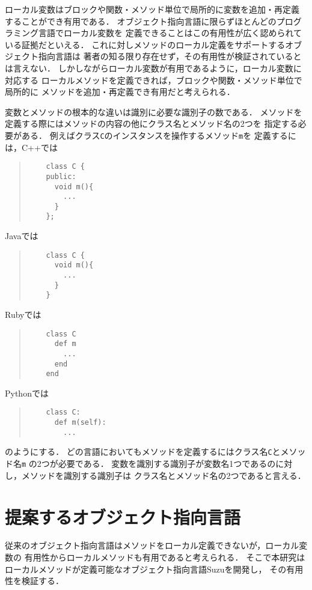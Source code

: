 \documentclass[a4paper,11pt,dvipdfmx]{jreport}
\begin{document}
ローカル変数はブロックや関数・メソッド単位で局所的に変数を追加・再定義
することができ有用である．
オブジェクト指向言語に限らずほとんどのプログラミング言語でローカル変数を
定義できることはこの有用性が広く認められている証拠だといえる．
これに対しメソッドのローカル定義をサポートするオブジェクト指向言語は
著者の知る限り存在せず，その有用性が検証されているとは言えない．
しかしながらローカル変数が有用であるように，ローカル変数に対応する
ローカルメソッドを定義できれば，ブロックや関数・メソッド単位で局所的に
メソッドを追加・再定義でき有用だと考えられる．

変数とメソッドの根本的な違いは識別に必要な識別子の数である．
メソッドを定義する際にはメソッドの内容の他にクラス名とメソッド名の2つを
指定する必要がある．
例えばクラス\verb|C|のインスタンスを操作するメソッド\verb|m|を
定義するには，C++では
\begin{quote}
	\begin{verbatim}
	class C {
	public:
	  void m(){
	    ...
	  }
	};
	\end{verbatim}
\end{quote}
Javaでは
\begin{quote}
	\begin{verbatim}
	class C {
	  void m(){
	    ...
	  }
	}
	\end{verbatim}
\end{quote}
Rubyでは
\begin{quote}
	\begin{verbatim}
	class C
	  def m
	    ...
	  end
	end
	\end{verbatim}
\end{quote}
Pythonでは
\begin{quote}
	\begin{verbatim}
	class C:
	  def m(self):
	    ...
	\end{verbatim}
\end{quote}
のようにする．
どの言語においてもメソッドを定義するにはクラス名\verb|C|とメソッド名\verb|m|
の2つが必要である．
変数を識別する識別子が変数名1つであるのに対し，メソッドを識別する識別子は
クラス名とメソッド名の2つであると言える．


\section{提案するオブジェクト指向言語}

従来のオブジェクト指向言語はメソッドをローカル定義できないが，ローカル変数の
有用性からローカルメソッドも有用であると考えられる．
そこで本研究はローカルメソッドが定義可能なオブジェクト指向言語Suzuを開発し，
その有用性を検証する．
\end{document}
